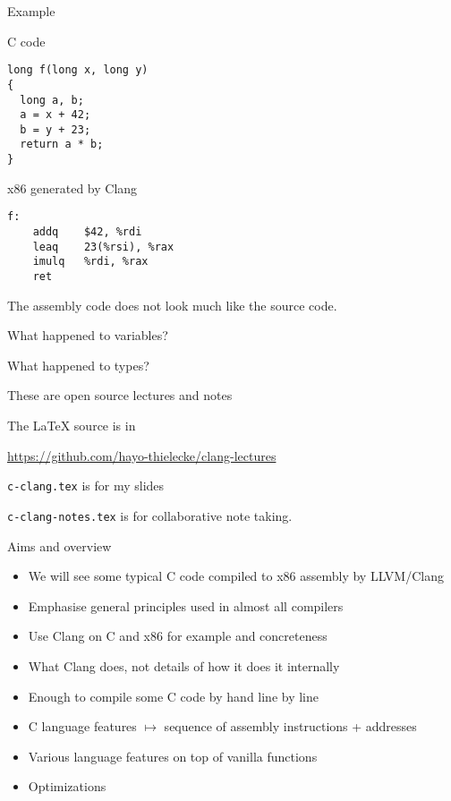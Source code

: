 \documentclass[landscape]{beamer}
\begin{document}
\begin{frame}[fragile]{Example}

\begin{minipage}{.5\textwidth}
C code
\begin{verbatim}
long f(long x, long y)
{
  long a, b;
  a = x + 42;
  b = y + 23;
  return a * b;
}
\end{verbatim}
\end{minipage}
%
\begin{minipage}{.4\textwidth}
x86 generated by Clang
\begin{verbatim}
f:                                      
	addq	$42, %rdi
	leaq	23(%rsi), %rax
	imulq	%rdi, %rax
	ret
\end{verbatim}
\end{minipage}
\vspace{2em}

The assembly code does not look much like the source code.
 

What happened to variables?

What happened to types?
\end{frame}

\begin{frame}{These are open source lectures and notes}

The \LaTeX{} source is in

\url{https://github.com/hayo-thielecke/clang-lectures}

\texttt{c-clang.tex} is for my slides

\texttt{c-clang-notes.tex} is for collaborative note taking.

\end{frame}

\begin{frame}{Aims and overview}

\begin{itemize}
\item
We will see some typical C code compiled to x86 assembly by LLVM/Clang
\item Emphasise general principles used in almost all compilers
\item Use Clang on C and x86 for example and concreteness
\item
\alert{What} Clang does, not details of \alert{how} it does it internally
\item
Enough to compile some C code by hand line by line
\item
C language features $\mapsto$ sequence of assembly instructions + addresses
\item
Various language features on top of vanilla functions
\item
Optimizations

\end{itemize}

\end{frame}
\end{document}
